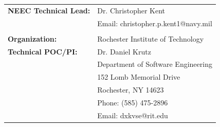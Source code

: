 \documentclass[12pt]{article}
\begin{document}
\begin{titlepage}
\begin{tabular}{ L{50mm} L{100mm} }
\vspace{-0mm} \normalsize \textbf{NEEC Technical Lead:} & \normalsize  Dr. Christopher Kent  \\
 & \normalsize Email: christopher.p.kent1@navy.mil  \\

\normalsize  \\ %
\normalsize \textbf{Organization:} & \normalsize  Rochester Institute of Technology  \\
\normalsize \textbf{Technical POC/PI:} & \normalsize  Dr. Daniel Krutz \\
 & \vspace{-2mm} \normalsize Department of Software Engineering
 \\

   & \vspace{-4mm} \normalsize 152 Lomb Memorial Drive \\
   & \vspace{-6mm} \normalsize Rochester, NY 14623 \\
   & \vspace{-8mm} \normalsize Phone: (585) 475-2896 \\
   & \vspace{-10mm} \normalsize Email: dxkvse@rit.edu \\



\end{tabular}





 \end{titlepage}
\end{document}
